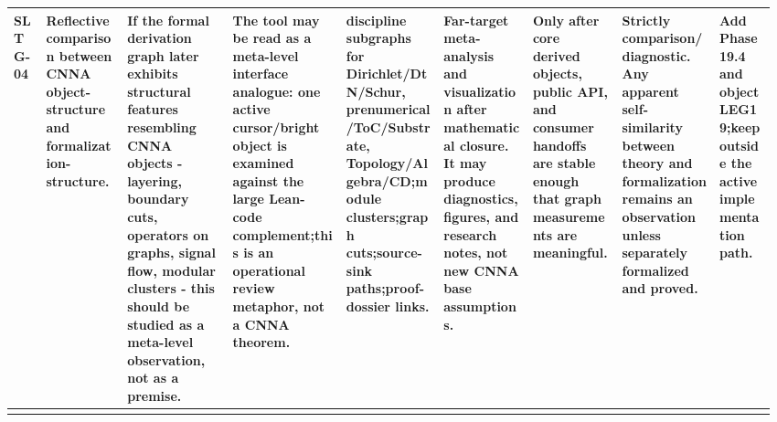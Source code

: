 \begin{longtable}{L{0.04\linewidth} L{0.105\linewidth} L{0.135\linewidth} L{0.145\linewidth} L{0.12\linewidth} L{0.115\linewidth} L{0.115\linewidth} L{0.12\linewidth} L{0.075\linewidth}}
\hline
\addlinespace[0.24em]
SLTG-04 & Reflective comparison between CNNA object-structure and formalization-structure. & If the formal derivation graph later exhibits structural features resembling CNNA objects - layering, boundary cuts, operators on graphs, signal flow, modular clusters - this should be studied as a meta-level observation, not as a premise. & The tool may be read as a meta-level interface analogue: one active cursor/\allowbreak{}bright object is examined against the large Lean-code complement;\newline this is an operational review metaphor, not a CNNA theorem. & discipline subgraphs for Dirichlet/\allowbreak{}DtN/\allowbreak{}Schur, prenumerical/\allowbreak{}ToC/\allowbreak{}Substrate, Topology/\allowbreak{}Algebra/\allowbreak{}CD;\newline module clusters;\newline graph cuts;\newline source-sink paths;\newline proof-dossier links. & Far-target meta-analysis and visualization after mathematical closure. It may produce diagnostics, figures, and research notes, not new CNNA base assumptions. & Only after core derived objects, public API, and consumer handoffs are stable enough that graph measurements are meaningful. & Strictly comparison/\allowbreak{}diagnostic. Any apparent self-similarity between theory and formalization remains an observation unless separately formalized and proved. & Add Phase 19.4 and object LEG19;\newline keep outside the active implementation path.\\
\hline
\addlinespace[0.24em]

\end{longtable}

